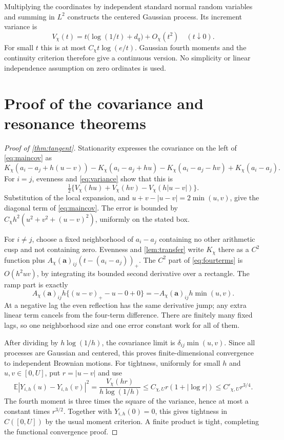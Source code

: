 \documentclass[11pt]{article}
\theoremstyle{definition}
\newcommand{\E}{\mathbb E}
\begin{document}
Multiplying the coordinates by independent standard normal random variables and
summing in $L^2$ constructs the centered Gaussian process. Its increment variance is
\begin{equation}\label{eq:variance}
 V_\chi(t)=t\bigl(\log(1/t)+d_q\bigr)+O_\chi(t^2)
 \quad(t\downarrow0).
\end{equation}
For small $t$ this is at most $C_\chi t\log(e/t)$. Gaussian fourth moments and
the continuity criterion therefore give a continuous version. No simplicity or
linear independence assumption on zero ordinates is used.

\section{Proof of the covariance and resonance theorems}

\begin{proof}[Proof of \cref{thm:tangent}]
Stationarity expresses the covariance on the left of \cref{eq:maincov} as
\begin{equation}\label{eq:fourterms}
 K_\chi(a_i-a_j+h(u-v))-K_\chi(a_i-a_j+hu)
 -K_\chi(a_i-a_j-hv)+K_\chi(a_i-a_j).
\end{equation}
For $i=j$, evenness and \cref{eq:variance} show that this is
\[
 \tfrac12\{V_\chi(hu)+V_\chi(hv)-V_\chi(h|u-v|)\}.
\]
Substitution of the local expansion, and
$u+v-|u-v|=2\min(u,v)$, give the diagonal term of \cref{eq:maincov}.
The error is bounded by $C_\chi h^2(u^2+v^2+(u-v)^2)$, uniformly on the stated box.

For $i\ne j$, choose a fixed neighborhood of $a_i-a_j$ containing no other
arithmetic cusp and not containing zero. Evenness and \cref{lem:transfer}
write $K_\chi$ there as a $C^2$ function plus
$A_\chi(\bm a)_{ij}(t-(a_i-a_j))_+$. The $C^2$ part of
\cref{eq:fourterms} is $O(h^2uv)$, by integrating its bounded second derivative
over a rectangle. The ramp part is exactly
\[
 A_\chi(\bm a)_{ij}h\{(u-v)_+-u-0+0\}
 =-A_\chi(\bm a)_{ij}h\min(u,v).
\]
At a negative lag the even reflection has the same derivative jump; any extra
linear term cancels from the four-term difference. There are finitely many fixed
lags, so one neighborhood size and one error constant work for all of them.

After dividing by $h\log(1/h)$, the covariance limit is
$\delta_{ij}\min(u,v)$. Since all processes are Gaussian and centered, this proves
finite-dimensional convergence to independent Brownian motions.
For tightness, uniformly for small $h$ and $u,v\in[0,U]$, put $r=|u-v|$ and use
\[
 \E|Y_{i,h}(u)-Y_{i,h}(v)|^2
 =\frac{V_\chi(hr)}{h\log(1/h)}
 \le C_{\chi,U}r(1+|\log r|)
 \le C'_{\chi,U}r^{3/4}.
\]
The fourth moment is three times the square of the variance, hence at most a
constant times $r^{3/2}$. Together with $Y_{i,h}(0)=0$, this gives tightness in
$C([0,U])$ by the usual moment criterion. A finite product is tight, completing
the functional convergence proof.
\end{proof}
\end{document}
